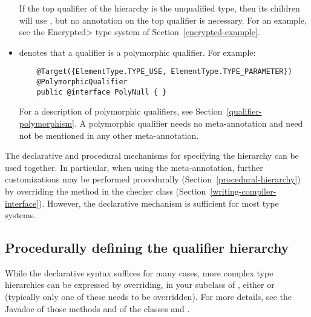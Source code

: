\begin{itemize}
  \begin{sloppypar}
  If the top qualifier of the hierarchy is the unqualified type, then its children
  will use , but no  annotation on the top qualifier is necessary.  For an example, see the
  \<Encrypted> type system of Section~\ref{encrypted-example}.
  \end{sloppypar}

\item {} denotes that a qualifier is a
  polymorphic qualifier.  For example:

  \begin{Verbatim}
    @Target({ElementType.TYPE_USE, ElementType.TYPE_PARAMETER})
    @PolymorphicQualifier
    public @interface PolyNull { }
  \end{Verbatim}

  For a description of polymorphic qualifiers, see
  Section~\ref{qualifier-polymorphism}.  A polymorphic qualifier needs
  no  meta-annotation and need not be
  mentioned in any other 
  meta-annotation.

\end{itemize}

The declarative and procedural mechanisms for specifying the hierarchy can
be used together.  In particular, when using the 
meta-annotation, further customizations may be
performed procedurally (Section~\ref{procedural-hierarchy})
by overriding the  method in the checker class
(Section~\ref{writing-compiler-interface}).
However, the declarative mechanism is sufficient for most type systems.


\subsection{Procedurally defining the qualifier hierarchy\label{procedural-hierarchy}}

While the declarative syntax suffices for many cases, more complex
type hierarchies can be expressed by overriding, in your subclass of ,
either  or  (typically
only one of these needs to be overridden).
For more details, see the Javadoc of those methods and of the classes
 and .


